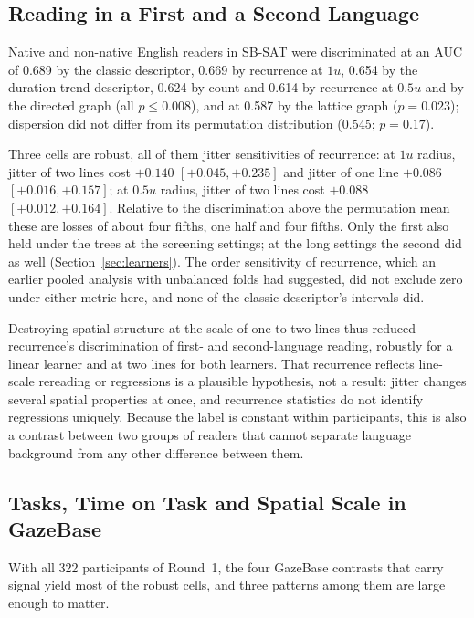 \subsection{Reading in a First and a Second Language}\label{sec:native}
Native and non-native English readers in SB-SAT were discriminated at an AUC of 0.689 by the classic descriptor, 0.669 by recurrence at $1u$, 0.654 by the duration-trend descriptor, 0.624 by count and 0.614 by recurrence at $0.5u$ and by the directed graph (all $p \leq 0.008$), and at 0.587 by the lattice graph ($p = 0.023$); dispersion did not differ from its permutation distribution (0.545; $p = 0.17$).

Three cells are robust, all of them jitter sensitivities of recurrence: at $1u$ radius, jitter of two lines cost $+0.140$ $[+0.045, +0.235]$ and jitter of one line $+0.086$ $[+0.016, +0.157]$; at $0.5u$ radius, jitter of two lines cost $+0.088$ $[+0.012, +0.164]$. Relative to the discrimination above the permutation mean these are losses of about four fifths, one half and four fifths. Only the first also held under the trees at the screening settings; at the long settings the second did as well (Section~\ref{sec:learners}). The order sensitivity of recurrence, which an earlier pooled analysis with unbalanced folds had suggested, did not exclude zero under either metric here, and none of the classic descriptor's intervals did.

Destroying spatial structure at the scale of one to two lines thus reduced recurrence's discrimination of first- and second-language reading, robustly for a linear learner and at two lines for both learners. That recurrence reflects line-scale rereading or regressions is a plausible hypothesis, not a result: jitter changes several spatial properties at once, and recurrence statistics do not identify regressions uniquely. Because the label is constant within participants, this is also a contrast between two groups of readers that cannot separate language background from any other difference between them.

\subsection{Tasks, Time on Task and Spatial Scale in GazeBase}\label{sec:gb}
With all 322 participants of Round~1, the four GazeBase contrasts that carry signal yield most of the robust cells, and three patterns among them are large enough to matter.

